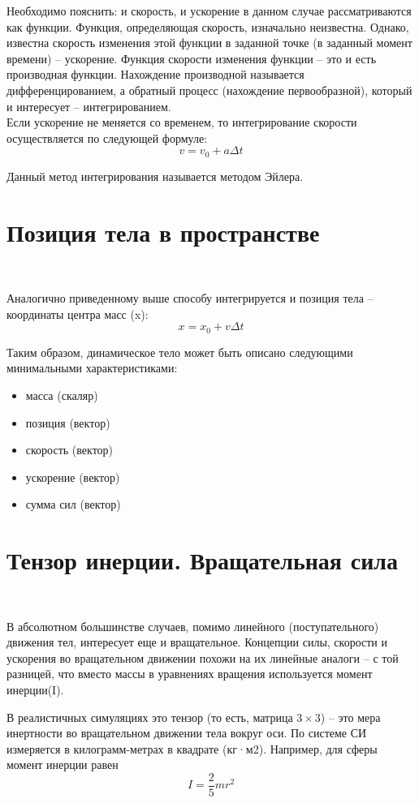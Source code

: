 Необходимо пояснить: и скорость, и ускорение в
данном случае рассматриваются как функции. Функция,
определяющая скорость, изначально неизвестна. Однако,
известна скорость изменения этой функции в заданной точке (в
заданный момент времени) – ускорение. Функция скорости
изменения функции – это и есть производная функции.
Нахождение производной называется дифференцированием, а
обратный процесс (нахождение первообразной), который и
интересует – интегрированием.
\\

Если ускорение не меняется со временем, то
интегрирование скорости осуществляется по следующей
формуле:
\begin{equation}
v = v_0 + a\Delta{t} 
\end{equation}

Данный метод интегрирования называется методом
Эйлера.

\section{Позиция тела в пространстве}
\

Аналогично приведенному выше способу интегрируется и позиция тела – координаты
центра масс (x):
\begin{equation}
x = x_0 + v\Delta{t}
\end{equation}

Таким образом, динамическое тело может быть описано
следующими минимальными характеристиками:
\begin{itemize}
  \item масса (скаляр)
  \item позиция (вектор)
  \item скорость (вектор)
  \item ускорение (вектор)
  \item сумма сил (вектор)
\end{itemize}

\section{Тензор инерции. Вращательная сила}
\

В абсолютном большинстве случаев, помимо линейного (поступательного)
движения тел, интересует еще и вращательное. Концепции силы, скорости
и ускорения во вращательном движении похожи на их линейные
аналоги – с той разницей, что вместо массы в уравнениях
вращения используется момент инерции(I).
\

В реалистичных симуляциях это тензор (то есть, матрица \begin{math}3\times3\end{math}) – это мера инертности во
вращательном движении тела вокруг оси. По системе СИ
измеряется в килограмм-метрах в квадрате (кг·м2). Например, для сферы
момент инерции равен
\begin{equation}
I = \frac{2}{5} mr^2 
\end{equation}

